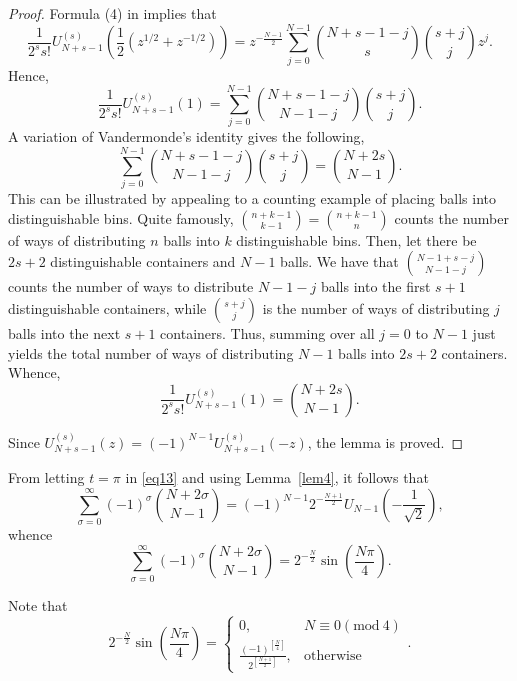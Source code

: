 \documentclass{article}
\begin{document}
\begin{proof}
Formula (4) in \cite{ref4} implies that
$$
\frac{1}{2^s s!}U_{N + s - 1}^{(s)}\left(\frac{1}{2}\left(z^{1/2} + z^{-1/2}\right)\right) = z^{-\frac{N - 1}{2}} \sum_{j = 0}^{N-1}{N + s - 1 - j \choose s}{s + j \choose j}z^j.
$$
Hence,
$$
\frac{1}{2^s s!}U_{N + s - 1}^{(s)}(1) = \sum_{j = 0}^{N - 1}{N + s - 1 - j \choose N - 1 - j}{s + j \choose j}.
$$
A variation of Vandermonde's identity \cite{ref11} gives the following,
$$
\sum_{j = 0}^{N - 1}{N + s - 1 - j \choose N - 1 - j}{s + j \choose j} = {N + 2s \choose N - 1}.
$$
This can be illustrated by appealing to a counting example of placing balls into distinguishable bins. Quite famously, ${n + k - 1 \choose k - 1} = {n + k - 1 \choose n}$ counts the number of ways of distributing $n$ balls into $k$ distinguishable bins. Then, let there be $2s + 2$ distinguishable containers and $N - 1$ balls. We have that ${N - 1 + s - j \choose N - 1 - j}$ counts the number of ways to distribute $N - 1 - j$ balls into the first $s + 1$ distinguishable containers, while ${s + j \choose j}$ is the number of ways of distributing $j$ balls into the next $s + 1$ containers. Thus, summing over all $j = 0$ to $N - 1$ just yields the total number of ways of distributing $N - 1$ balls into $2s + 2$ containers. Whence,
$$
\frac{1}{2^s s!}U_{N + s - 1}^{(s)}(1) = {N + 2s \choose N - 1}.
$$

Since $U_{N + s - 1}^{(s)}(z) = (-1)^{N - 1}U_{N + s - 1}^{(s)}(-z)$, the lemma is proved.
\end{proof}

From letting $t = \pi$ in \eqref{eq13} and using Lemma~\ref{lem4}, it follows that
$$
\sum_{\sigma = 0}^{\infty}{(-1)^\sigma}{N + 2\sigma \choose N - 1} = (-1)^{N - 1}2^{-\frac{N + 1}{2}}U_{N - 1}\left(-\frac{1}{\sqrt{2}}\right),
$$
whence
\begin{equation}\label{eq14}
\sum_{\sigma = 0}^{\infty}(-1)^{\sigma}{N + 2\sigma \choose N - 1} = 2^{-\frac{N}{2}} \sin\left(\frac{N\pi}{4}\right).
\end{equation}

Note that
$$
2^{-\frac{N}{2}} \sin\left(\frac{N\pi}{4}\right) = \begin{cases}
0, & N \equiv 0 (\mbox{mod} \ 4) \\
\frac{(-1)^{\left[\frac{N}{4}\right]}}{2^{\left[\frac{N+1}{2}\right]}}, & \mbox{otherwise}
\end{cases}.
$$
\end{document}
